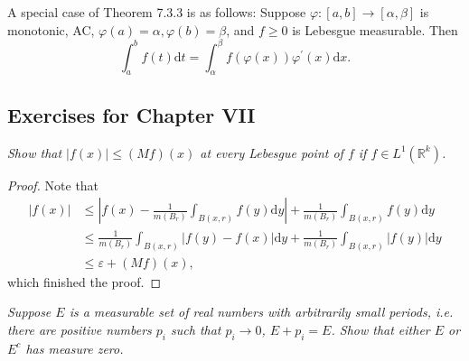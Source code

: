 A special case of Theorem 7.3.3 is as follows: Suppose $\varphi:[a,b]\to[\alpha,\beta]$ is monotonic, AC, $\varphi(a)=\alpha,\varphi(b)=\beta$, and $f\ge 0$ is Lebesgue measurable. Then 
$$
\int_a^b{f\left( t \right) \mathrm{d}t}=\int_{\alpha}^{\beta}{f\left( \varphi \left( x \right) \right) \varphi ^{\prime}\left( x \right) \mathrm{d}x}.
$$
\subsection{Exercises for Chapter VII}
\begin{problem}\em
Show that $|f(x)|\le(Mf)(x)$ at every Lebesgue point of $f$ if $f\in L^1(\mathbb{R}^k)$.
\end{problem}
\begin{proof}
Note that 
$$
\begin{aligned}
\left| f\left( x \right) \right|&\le \left| f\left( x \right) -\frac{1}{m\left( B_r \right)}\int_{B\left( x,r \right)}{f\left( y \right) \mathrm{d}y} \right|+\frac{1}{m\left( B_r \right)}\int_{B\left( x,r \right)}{f\left( y \right) \mathrm{d}y}
\\
&\le \frac{1}{m\left( B_r \right)}\int_{B\left( x,r \right)}{\left| f\left( y \right) -f\left( x \right) \right|\mathrm{d}y}+\frac{1}{m\left( B_r \right)}\int_{B\left( x,r \right)}{\left| f\left( y \right) \right|\mathrm{d}y}
\\
&\le \varepsilon +\left( Mf \right) \left( x \right) ,
\end{aligned}
$$
which finished the proof.
\end{proof}
\begin{problem}\em
Suppose $E$ is a measurable set of real numbers with arbitrarily small periods, i.e. there are positive numbers $p_i$ such that $p_i\to 0$, $E+p_i=E$. Show that either $E$ or $E^c$ has measure zero.
\end{problem}
